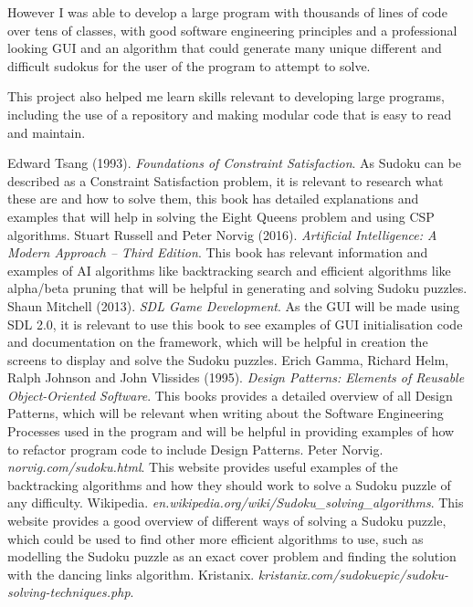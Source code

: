 \documentclass[]{final_report}
\begin{document}
However I was able to develop a large program with thousands of lines of code over tens of classes, with good software engineering principles and a professional looking GUI and an algorithm that could generate many unique different and difficult sudokus for the user of the program to attempt to solve.

This project also helped me learn skills relevant to developing large programs, including the use of a repository and making modular code that is easy to read and maintain.

\newpage
\begin{thebibliography}{99}
	 Edward Tsang (1993). \emph{Foundations of Constraint Satisfaction}.
	\newline
	As Sudoku can be described as a Constraint Satisfaction problem, it is relevant to research what these are and how to solve them, this book has detailed explanations and examples that will help in solving the Eight Queens problem and using CSP algorithms.
	 Stuart Russell and Peter Norvig (2016). \emph{Artificial Intelligence: A Modern Approach -- Third Edition}.
	\newline
	This book has relevant information and examples of AI algorithms like backtracking search and efficient algorithms like alpha/beta pruning that will be helpful in generating and solving Sudoku puzzles.
	 Shaun Mitchell (2013). \emph{SDL Game Development}.
	\newline
	As the GUI will be made using SDL 2.0, it is relevant to use this book to see examples of GUI initialisation code and documentation on the framework, which will be helpful in creation the screens to display and solve the Sudoku puzzles.
	 Erich Gamma, Richard Helm, Ralph Johnson and John Vlissides (1995). \emph{Design Patterns: Elements of Reusable Object-Oriented Software}.
	\newline
	This books provides a detailed overview of all Design Patterns, which will be relevant when writing about the Software Engineering Processes used in the program and will be helpful in providing examples of how to refactor program code to include Design Patterns.
	 Peter Norvig. \emph{norvig.com/sudoku.html}.
	\newline
	This website provides useful examples of the backtracking algorithms and how they should work to solve a Sudoku puzzle of any difficulty.
	 Wikipedia. \emph{en.wikipedia.org/wiki/Sudoku\_solving\_algorithms}.
	\newline
	This website provides a good overview of different ways of solving a Sudoku puzzle, which could be used to find other more efficient algorithms to use, such as modelling the Sudoku puzzle as an exact cover problem and finding the solution with the dancing links algorithm.
	  Kristanix. \emph{kristanix.com/sudokuepic/sudoku-solving-techniques.php}.
\end{thebibliography}
\end{document}
